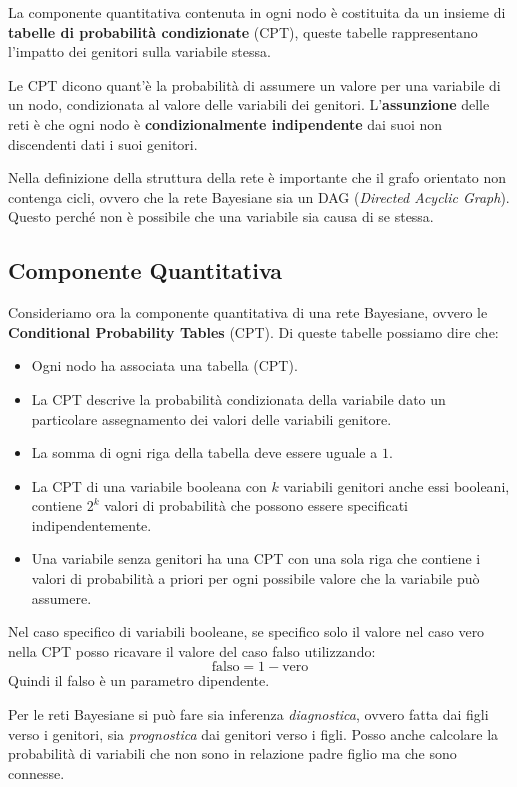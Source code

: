 La componente quantitativa contenuta in ogni nodo è costituita da un insieme di
\textbf{tabelle di probabilità condizionate} (CPT), queste tabelle rappresentano
l'impatto dei genitori sulla variabile stessa.

Le CPT dicono quant'è la probabilità di assumere un valore per una variabile di
un nodo, condizionata al valore delle variabili dei genitori. L'\textbf{assunzione}
delle reti è che ogni nodo è \textbf{condizionalmente indipendente} dai suoi non
discendenti dati i suoi genitori.

Nella definizione della struttura della rete è importante che il grafo orientato
non contenga cicli, ovvero che la rete Bayesiane sia un DAG (\textit{Directed Acyclic
    Graph}). Questo perché non è possibile che una variabile sia causa di se stessa.
\subsection{Componente Quantitativa}
Consideriamo ora la componente quantitativa di una rete Bayesiane, ovvero le
\textbf{Conditional Probability Tables} (CPT). Di queste tabelle possiamo dire che:
\begin{itemize}
    \item Ogni nodo ha associata una tabella (CPT).
    \item La CPT descrive la probabilità condizionata della variabile dato un
          particolare assegnamento dei valori delle variabili genitore.
    \item La somma di ogni riga della tabella deve essere uguale a $1$.
    \item La CPT di una variabile booleana con $k$ variabili genitori anche essi
          booleani, contiene $2^k$ valori di probabilità che possono essere
          specificati indipendentemente.
    \item Una variabile senza genitori ha una CPT con una sola riga che contiene
          i valori di probabilità a priori per ogni possibile valore che la
          variabile può assumere.
\end{itemize}
\begin{nota}
    Nel caso specifico di variabili booleane, se specifico solo il valore nel
    caso vero nella CPT posso ricavare il valore del caso falso utilizzando:
    \begin{equation*}
        \text{falso} = 1 - \text{vero}
    \end{equation*}
    Quindi il falso è un parametro dipendente.
\end{nota}
Per le reti Bayesiane si può fare sia inferenza \textit{diagnostica}, ovvero fatta
dai figli verso i genitori, sia \textit{prognostica} dai genitori verso i figli.
Posso anche calcolare la probabilità di variabili che non sono in relazione padre
figlio ma che sono connesse.
